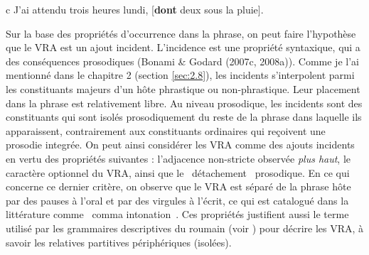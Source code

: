   c  J'ai attendu trois heures lundi, [\textbf{dont} deux sous la pluie].

Sur la base des propriétés d'occurrence dans la phrase, on peut faire l'hypothèse que le VRA est un ajout incident. L'incidence est une propriété syntaxique, qui a des conséquences prosodiques (Bonami \& Godard (2007c, 2008a)). Comme je l'ai mentionné dans le chapitre 2 (section \ref{sec:2.8}), les incidents s'interpolent parmi les constituants majeurs d'un hôte phrastique ou non-phrastique. Leur placement dans la phrase est relativement libre. Au niveau prosodique, les incidents sont des constituants qui sont isolés prosodiquement du reste de la phrase dans laquelle ils apparaissent, contrairement aux constituants ordinaires qui reçoivent une prosodie integrée. On peut ainsi considérer les VRA comme des ajouts incidents en vertu des propriétés suivantes : l'adjacence non-stricte observée \textit{plus haut}, le caractère optionnel du VRA, ainsi que le {\guillemotleft}~détachement~{\guillemotright} prosodique. En ce qui concerne ce dernier critère, on observe que le VRA est séparé de la phrase hôte par des pauses à l'oral et par des virgules à l'écrit, ce qui est catalogué dans la littérature comme {\guillemotleft}~comma intonation~{\guillemotright}. Ces propriétés justifient aussi le terme utilisé par les grammaires descriptives du roumain (voir \citet{Gheorghe2005}) pour décrire les VRA, à savoir les relatives partitives périphériques (isolées).

